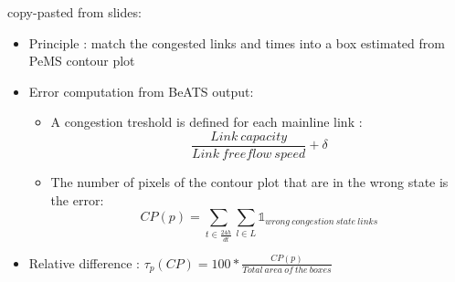 
\color{red}copy-pasted from slides:\color{black}\\
\begin{itemize}
		\item Principle : match the congested links and times into a box estimated from PeMS contour plot
		\item Error computation from BeATS output:
		\begin{itemize}
			\item A congestion treshold is defined for each mainline link :
			\begin{equation*} 
				\frac{Link\ capacity}{Link\ freeflow\ speed}+\delta
			\end{equation*}
			\item The number of pixels of the contour plot that are in the wrong state is the error:
			\begin{equation*}
				CP(p)=\sum_{t\in{\frac{24h}{dt}}}\sum_{l\in{L}}\mathds{1}_{wrong\ congestion\ state\ links}
			\end{equation*}
			\end{itemize}
		\item Relative difference : $\tau_{p}(CP)=100* \frac{CP(p)}{Total\ area\ of\ the\ boxes}$
	\end{itemize}